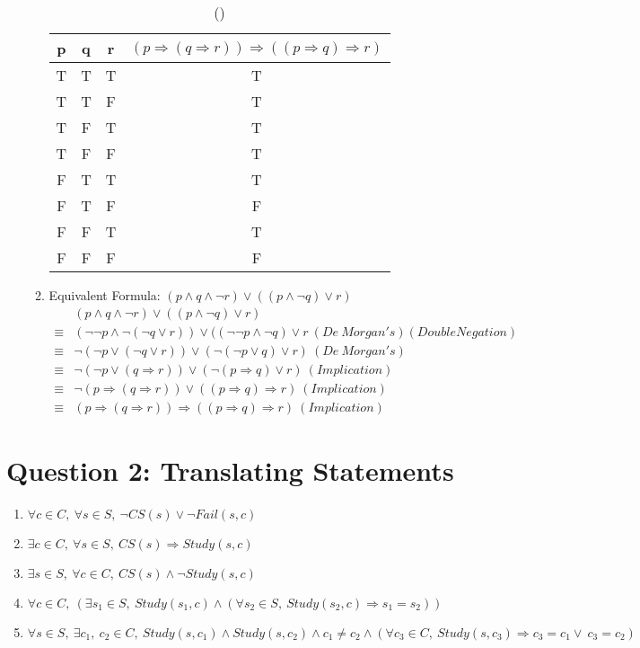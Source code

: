 \documentclass[12pt]{article}
\begin{document}
\begin{enumerate}
\begin{enumerate}[label=(\roman*)]
\begin{table}[h]
\centering
\begin{tabular}{|c|c|c|c|} \hline
p & q & r & $(p\Rightarrow (q\Rightarrow r))\Rightarrow ((p\Rightarrow q)\Rightarrow r) $ \\
\hline
	T & T & T & T \\
\hline
	T & T & F & T \\
\hline
	T & F & T & T \\
\hline
	T & F & F & T \\
\hline
	F & T & T & T \\
\hline
	F & T & F & F \\
\hline
	F & F & T & T \\
\hline
	F & F & F & F \\ \hline
\end{tabular}
\caption{()}
\end{table}
		\item Equivalent Formula: $(p\wedge q\wedge \neg r)\vee ((p\wedge \neg q)\vee r)$ 
\begin{align*}
	&(p\wedge q\wedge \neg r)\vee ((p\wedge \neg q)\vee r) \\
	\equiv &(\neg \neg p \wedge \neg (\neg q \vee r))\vee ((\neg \neg p \wedge \neg q) \vee r\ (De\ Morgan's)(Double Negation) \\
	\equiv &\neg(\neg p\vee (\neg q \vee r))\vee (\neg(\neg p \vee q)\vee r)\ (De\ Morgan's)\\
	\equiv &\neg(\neg p \vee (q\Rightarrow r)) \vee (\neg(p \Rightarrow q)\vee r)\ (Implication)\\
	\equiv &\neg(p\Rightarrow (q \Rightarrow r))\vee ((p\Rightarrow q) \Rightarrow r)\ (Implication)\\
	\equiv &(p\Rightarrow (q\Rightarrow r))\Rightarrow ((p\Rightarrow q)\Rightarrow r)\ (Implication)
\end{align*}
	\end{enumerate}
	
\end{enumerate}
\newpage

\section{Question 2: Translating Statements}
\begin{enumerate}[label=(\alph*)]
	\item $\forall c\in C,\ \forall s \in S,\ \neg CS(s)\vee \neg Fail(s, c)$
	\item $\exists c \in C,\ \forall s \in S,\ CS(s)\Rightarrow Study(s, c)$
	\item $\exists s \in S,\ \forall c \in C,\ CS(s) \wedge \neg Study(s, c)$
	\item $\forall c \in C,\ (\exists s_1 \in S,\ Study(s_1, c)\wedge (\forall s_2 \in S,\ Study(s_2, c)\Rightarrow s_1=s_2))$
	\item $\forall s \in S,\ \exists c_1,\ c_2 \in C,\ Study(s, c_1)\wedge Study(s, c_2)\wedge c_1 \neq c_2 \wedge (\forall c_3 \in C,\ Study(s, c_3)\Rightarrow c_3=c_1 \vee\ c_3=c_2)$
\end{enumerate}
\end{document}

